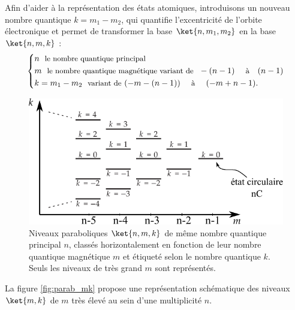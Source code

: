 Afin d'aider à la représentation des états atomiques, introduisons un nouveau nombre quantique $k=m_1-m_2$, qui quantifie l'excentricité de l'orbite électronique et permet de transformer la base $\ket{n,m_1,m_2}$ en la base $\ket{n,m,k}$ :
\begin{equation}\label{eq:base_nmk}
\left\{
\begin{aligned}
&n \text{ \begin{small}
le nombre quantique principal
\end{small}}\\
&m \text{ \begin{small}
le nombre quantique magnétique variant de
\end{small} }
-(n-1)~~ \text{ \begin{small} à \end{small}} ~~(n-1)\\
&k=m_1-m_2 \text{ \begin{small} variant de\end{small} } (-m-(n-1))~~ \text{ \begin{small} à \end{small} } ~~(-m+n-1).
\end{aligned} \right.
\end{equation}
%


\begin{figure}[!h]
\centering
\includegraphics[width=.7\linewidth]{figures/theory/echelle_parabolique_mk}
\caption[Échelle des niveaux paraboliques $\ket{n,m,k}$]{
Niveaux paraboliques $\ket{n,m,k}$ de même nombre quantique principal $n$, classés horizontalement en fonction de leur nombre quantique magnétique $m$ et étiqueté selon le nombre quantique $k$.
Seuls les niveaux de très grand $m$ sont représentés.
}
\label{fig:parab_mk}
\end{figure}

\noindent La figure \eqref{fig:parab_mk} propose une représentation schématique des niveaux $\ket{m,k}$ de $m$ très élevé au sein d'une multiplicité $n$.


